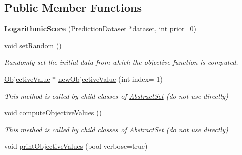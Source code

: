 \subsection*{Public Member Functions}
\begin{DoxyCompactItemize}
\item 
\hypertarget{classLogarithmicScore_a4fba67dfac53087dbfde7cb825501c97}{{\bfseries Logarithmic\-Score} (\hyperlink{classPredictionDataset}{Prediction\-Dataset} $\ast$dataset, int prior=0)}\label{classLogarithmicScore_a4fba67dfac53087dbfde7cb825501c97}

\item 
\hypertarget{classLogarithmicScore_a7e3c601e96541b3156b02d84ce6b754e}{void \hyperlink{classLogarithmicScore_a7e3c601e96541b3156b02d84ce6b754e}{set\-Random} ()}\label{classLogarithmicScore_a7e3c601e96541b3156b02d84ce6b754e}

\begin{DoxyCompactList}\small\item\em Randomly set the initial data from which the objective function is computed. \end{DoxyCompactList}\item 
\hypertarget{classLogarithmicScore_ab64011283bff491364cdffb0420dc89b}{\hyperlink{classObjectiveValue}{Objective\-Value} $\ast$ \hyperlink{classLogarithmicScore_ab64011283bff491364cdffb0420dc89b}{new\-Objective\-Value} (int index=-\/1)}\label{classLogarithmicScore_ab64011283bff491364cdffb0420dc89b}

\begin{DoxyCompactList}\small\item\em This method is called by child classes of \hyperlink{classAbstractSet}{Abstract\-Set} (do not use directly) \end{DoxyCompactList}\item 
\hypertarget{classLogarithmicScore_ac0a5eb6f03d9afd66a05aded42e6647f}{void \hyperlink{classLogarithmicScore_ac0a5eb6f03d9afd66a05aded42e6647f}{compute\-Objective\-Values} ()}\label{classLogarithmicScore_ac0a5eb6f03d9afd66a05aded42e6647f}

\begin{DoxyCompactList}\small\item\em This method is called by child classes of \hyperlink{classAbstractSet}{Abstract\-Set} (do not use directly) \end{DoxyCompactList}\item 
\hypertarget{classLogarithmicScore_add0be2f6175a2aa0ef5e20026f9eb2be}{void \hyperlink{classLogarithmicScore_add0be2f6175a2aa0ef5e20026f9eb2be}{print\-Objective\-Values} (bool verbose=true)}\label{classLogarithmicScore_add0be2f6175a2aa0ef5e20026f9eb2be}


\end{DoxyCompactItemize}
